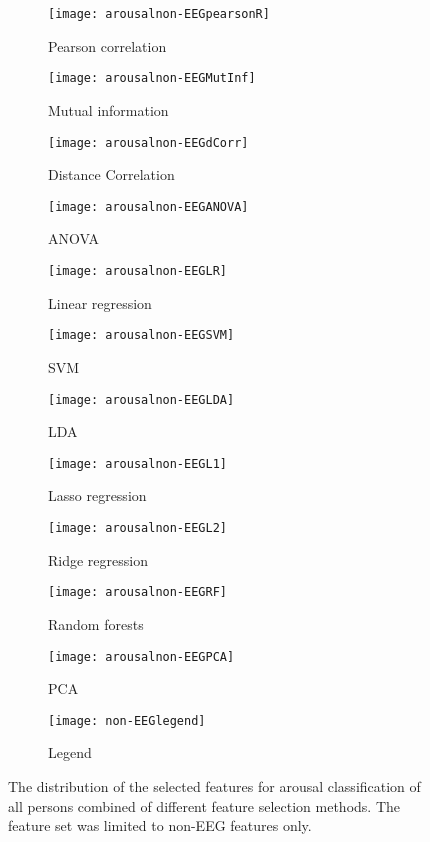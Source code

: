 \begin{figure}[!tbp]
  \centering
  \begin{subfigure}[b]{0.3\textwidth}
    \texttt{[image: arousalnon-EEGpearsonR]}
    \caption{Pearson correlation}
  \end{subfigure}
  \hfill
  \begin{subfigure}[b]{0.3\textwidth}
    \texttt{[image: arousalnon-EEGMutInf]}
    \caption{Mutual information}
  \end{subfigure}
  \hfill
  \begin{subfigure}[b]{0.3\textwidth}
    \texttt{[image: arousalnon-EEGdCorr]}
    \caption{Distance Correlation}
  \end{subfigure}
  
  \begin{subfigure}[b]{0.3\textwidth}
    \texttt{[image: arousalnon-EEGANOVA]}
    \caption{ANOVA}
  \end{subfigure}
  \hfill
  \begin{subfigure}[b]{0.3\textwidth}
    \texttt{[image: arousalnon-EEGLR]}
    \caption{Linear regression}
  \end{subfigure}
  \hfill
  \begin{subfigure}[b]{0.3\textwidth}
    \texttt{[image: arousalnon-EEGSVM]}
    \caption{SVM}
  \end{subfigure}
  
  \begin{subfigure}[b]{0.3\textwidth}
    \texttt{[image: arousalnon-EEGLDA]}
    \caption{LDA}
  \end{subfigure}
  \hfill
  \begin{subfigure}[b]{0.3\textwidth}
    \texttt{[image: arousalnon-EEGL1]}
    \caption{Lasso regression}
  \end{subfigure}
  \hfill
  \begin{subfigure}[b]{0.3\textwidth}
    \texttt{[image: arousalnon-EEGL2]}
    \caption{Ridge regression}
  \end{subfigure}
  
  \begin{subfigure}[b]{0.3\textwidth}
    \texttt{[image: arousalnon-EEGRF]}
    \caption{Random forests}
  \end{subfigure}
  \hfill
  \begin{subfigure}[b]{0.3\textwidth}
    \texttt{[image: arousalnon-EEGPCA]}
    \caption{PCA}
  \end{subfigure}
  \hfill
  \begin{subfigure}[b]{0.3\textwidth}
    \texttt{[image: non-EEGlegend]}
    \caption{Legend\label{arousalpiesnon-EEGlegend}}
  \end{subfigure}    
\caption{The distribution of the selected features for arousal classification of all persons combined of different feature selection methods. The feature set was limited to non-EEG features only.\label{arousalnon-EEGpies}}
\end{figure}

